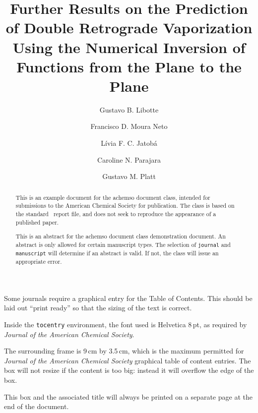 \documentclass[journal=iecred,manuscript=article]{achemso}
\author{Gustavo B. Libotte}
\author{Francisco D. Moura Neto}
\author{L\'{i}via F. C. Jatob\'{a}}
\author{Caroline N. Parajara}
\author{Gustavo M. Platt}
\affiliation[Unknown University]
{Polytechnic Institute, Rio de Janeiro State University, Nova Friburgo, Brazil}
\title[An \textsf{achemso} demo]
  {Further Results on the Prediction of Double Retrograde Vaporization Using the Numerical Inversion of Functions from the Plane to the Plane}
\theoremstyle{definition}
\theoremstyle{remark}
\begin{document}
\begin{tocentry}

Some journals require a graphical entry for the Table of Contents.
This should be laid out \enquote{print ready} so that the sizing of the
text is correct.

Inside the \texttt{tocentry} environment, the font used is Helvetica
8\,pt, as required by \emph{Journal of the American Chemical
Society}.

The surrounding frame is 9\,cm by 3.5\,cm, which is the maximum
permitted for  \emph{Journal of the American Chemical Society}
graphical table of content entries. The box will not resize if the
content is too big: instead it will overflow the edge of the box.

This box and the associated title will always be printed on a
separate page at the end of the document.

\end{tocentry}

\begin{abstract}
  This is an example document for the \textsf{achemso} document
  class, intended for submissions to the American Chemical Society
  for publication. The class is based on the standard \LaTeXe\
  \textsf{report} file, and does not seek to reproduce the appearance
  of a published paper.

  This is an abstract for the \textsf{achemso} document class
  demonstration document.  An abstract is only allowed for certain
  manuscript types.  The selection of \texttt{journal} and
  \texttt{manuscript} will determine if an abstract is valid.  If
  not, the class will issue an appropriate error.
\end{abstract}

\end{document}
